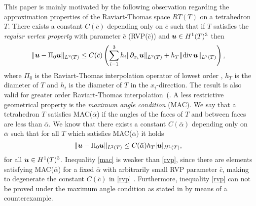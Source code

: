 This paper is mainly motivated by the following observation regarding the approximation properties of the Raviart-Thomas space $RT(T)$ on a tetrahedron $T$. There exists a constant $C(\bar c)$ depending only on $\bar c$ such that if $T$ satisfies the {\it regular vertex property} with parameter $\bar c$ (RVP($\bar c$)) and $\boldsymbol{u}\in H^1(T)^3$ then
\begin{equation}\label{rvp}
\|\boldsymbol{u}-\Pi_0\boldsymbol{u}\|_{L^2(T)}\le C(\bar c)\left(\sum_{i=1}^3h_i\|\partial_{x_i}\boldsymbol{u}\|_{L^2(T)}+ h_T\|\mbox{div\,}\boldsymbol{u}\|_{L^2(T)}\right),
\end{equation}
where $\Pi_0$ is the Raviart-Thomas interpolation operator of lowest order \cite{N, RT}, $h_T$ is the diameter of $T$ and $h_i$ is the diameter of $T$ in the $x_i$-direction. The result is also valid for greater order Raviart-Thomas interpolation~(\cite{AApDL2}. A less restrictive geometrical property is the {\it maximum angle condition} (MAC). We say that a tetrahedron $T$ satisfies MAC($\bar\alpha$) if the angles of the faces of $T$ and between faces are less than $\bar\alpha$. We know that there exists a constant $C(\bar\alpha)$ depending only on $\bar\alpha$ such that for all $T$ which satisfies MAC($\bar\alpha$) it holds
\begin{equation}\label{mac}
\|\boldsymbol{u}-\Pi_0\boldsymbol{u}\|_{L^2(T)}\le C(\bar\alpha)h_T|\boldsymbol{u}|_{H^1(T)},
\end{equation}
for all $\boldsymbol{u}\in H^1(T)^3$. Inequality \eqref{mac} is weaker than \eqref{rvp}, since there are elements satisfying MAC($\bar\alpha$) for a fixed $\bar\alpha$ with arbitrarily small RVP parameter $\bar c$, making to degenerate  the constant $C(\bar c)$ in \eqref{rvp} \cite{AApDL2}. Furthermore, inequality \eqref{rvp} can not be proved under the maximum angle condition as stated in \cite{AApDL2} by means of a counterexample.

